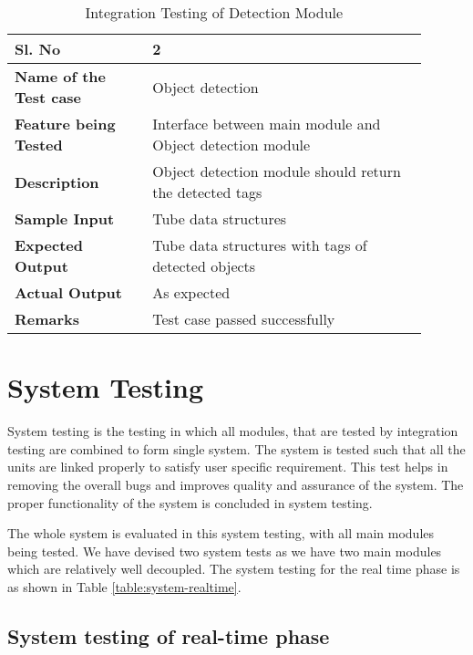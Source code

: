     \FloatBarrier
    \begin{table}[H]
        \begin{tabular}{|p{0.3\linewidth}|p{0.6\linewidth}|}
            \hline
            \textbf{Sl. No }              &\textbf{ 2}\\
            \hline
            \textbf{Name of the Test case}  & Object detection \\
            \hline
            \textbf{Feature being Tested}  & Interface between main module and Object detection module \\
            \hline
            \textbf{Description}           & Object detection module should return the detected tags \\
            \hline
            \textbf{Sample Input}          & Tube data structures \\
            \hline
            \textbf{Expected Output}       & Tube data structures with tags of detected objects \\
            \hline
            \textbf{Actual Output}         & As expected \\
            \hline
            \textbf{Remarks }              & Test case passed successfully \\
            \hline
        \end{tabular}
        \caption{Integration Testing of Detection Module}
        \label{table:integration-detection}
    \end{table}

\section{System Testing}

System testing is the testing in which all modules,  that  are  tested  by  integration testing are combined  to  form  single  system. The system is  tested  such  that  all  the units are linked properly to satisfy user specific requirement. This  test  helps  in  removing the overall bugs and  improves  quality  and  assurance  of  the  system.  The proper functionality of the system is concluded in system testing.

The whole system is evaluated in this system testing, with all main modules being tested. We have devised two system tests as we have two main modules which are relatively well decoupled. The system testing for the real time phase is as shown in Table \ref{table:system-realtime}.

    \subsection{System testing of real-time phase}

